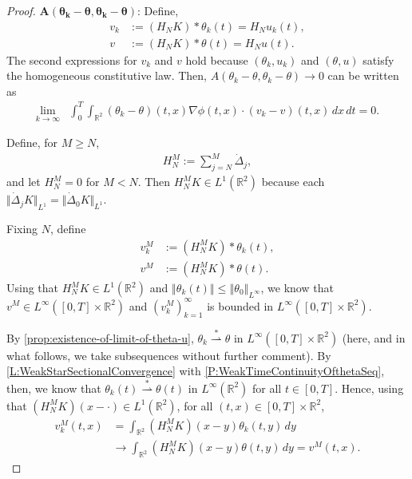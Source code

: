 \documentclass[10pt,a4paper]{amsart}
\newcommand{\Del}{\dot{\Delta}}
\def\R{{\mathbb R}}
\newcommand{\iny}{\ensuremath{\infty}}
\newcommand{\norm}[1]{\ensuremath{\left\Vert #1 \right\Vert}}
\newcommand{\smallnorm}[1]{\ensuremath{\Vert #1 \Vert}}
\newcommand{\wstar}{\overset{*}{\rightharpoonup}}
\begin{document}
\begin{proof}
    \smallskip\noindent$\boldsymbol{A(\theta_k - \theta,
    	\theta_k - \theta)}$:
    Define,
    \begin{align*}
        v_k
            &:= (H_N K) * \theta_k(t)
            = H_N u_k(t), \\
        v &
            := (H_N K) * \theta(t)
            = H_N u(t).
    \end{align*}
    The second expressions for $v_k$ and $v$ hold because $(\theta_k, u_k)$ and $(\theta, u)$ satisfy the homogeneous constitutive law.
	Then, $A(\theta_k - \theta, \theta_k - \theta) \to 0$ can
	be written as
    \begin{align}\label{e:KeyNonFinal}
         \lim_{k \to \iny} &\int_0^T \int_{\R^2}
         	(\theta_k - \theta)(t,x)
            \nabla\phi(t,x) \cdot (v_k - v)(t, x)
                \, dx \, dt
            = 0.
    \end{align}
    
    Define, for $M \ge N$,
    \begin{align}\label{e:HNM}
        H_N^M := \sum_{j = N}^M \Del_j,
    \end{align}
    and let $H_N^M = 0$ for $M < N$. Then $H_N^M K \in L^1(\R^2)$ because each $\smallnorm{\Del_j K}_{L^1} = \smallnorm{\Del_0 K}_{L^1}$.

    Fixing $N$, define
    \begin{align*}
        v_k^M &:= (H_N^M K) * \theta_k(t), \\
        v^M &:= (H_N^M K) * \theta(t).
    \end{align*}
    Using that $H_N^M K \in L^1(\R^2)$ and $\norm{\theta_k(t)} \le \norm{\theta_0}_{L^\iny}$, we know that $v^M \in L^\iny([0, T] \times \R^2)$ and $(v_k^M)_{k = 1}^\iny$ is bounded in $L^\iny([0, T] \times \R^2)$.

    By \cref{prop:existence-of-limit-of-theta-u}, $\theta_k \wstar \theta$ in $L^\iny([0, T] \times \R^2)$ (here, and in what follows, we take subsequences without further comment). By \cref{L:WeakStarSectionalConvergence} with \cref{P:WeakTimeContinuityOfthetaSeq}, then, we know that $\theta_k(t) \wstar \theta(t)$ in $L^\iny(\R^2)$ for all $t \in [0, T]$. Hence, using that $(H_N^M K)(x - \cdot) \in L^1(\R^2)$, for all $(t, x) \in [0, T] \times \R^2$,
    \begin{align*}        
        v_k^M(t, x)
            &= \int_{\R^2} (H_N^M K)(x - y) \theta_k(t, y)
                \, dy \\
            &\to \int_{\R^2} (H_N^M K)(x - y) \theta(t, y)
                \, dy
            = v^M(t, x).
    \end{align*}


\end{proof}
\end{document}
